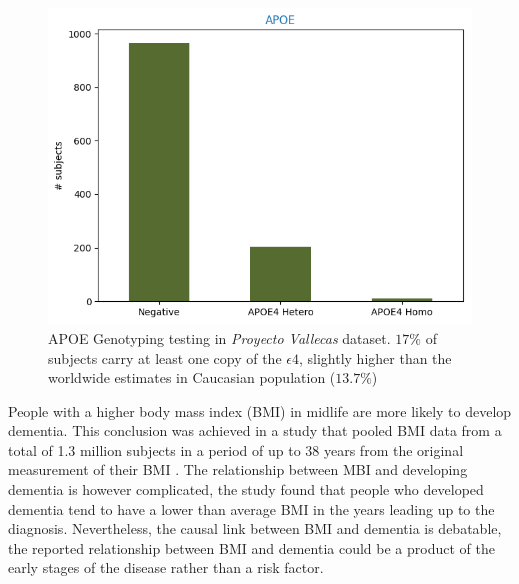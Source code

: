\documentclass[11pt]{article}
\theoremstyle{definition}
\theoremstyle{remark}
\begin{document}
\begin{figure}[H]
        \centering
        \includegraphics[keepaspectratio, width=0.6\linewidth]{figures/Fig_apoe}
        \caption{APOE Genotyping testing in \emph{Proyecto Vallecas} dataset. $17\%$ of subjects carry at least one copy of the $\epsilon4$, slightly higher than the worldwide estimates in Caucasian population ($13.7\%$) \cite{farrer1997effects}} 
        \label{fig:apoe}
\end{figure}


People with a higher body mass index (BMI) in midlife are more likely to develop dementia. This conclusion was achieved in a study that pooled BMI data from a total of 1.3 million subjects in a period of up to 38 years from the original measurement of their BMI \cite{kivimaki2018body}. 
The relationship between MBI and developing dementia is however complicated, the study found that people who developed dementia tend to have a lower than average BMI in the years leading up to the diagnosis. 
Nevertheless, the causal link between BMI and dementia is debatable, the reported relationship between BMI and dementia could be a product of the early stages of the disease rather than a risk factor. 
\end{document}
